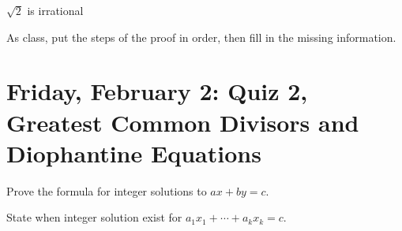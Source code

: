 \documentclass{ximera}
\begin{document}
\begin{br}
	\begin{prop*}
		$\sqrt{2}$ is irrational
	\end{prop*}

	As class, put the steps of the proof in order, then fill in the missing information.
\end{br}



%		
%			
%		

\section{Friday, February 2: Quiz 2, Greatest Common Divisors and Diophantine Equations}

\begin{obj}
	\item Prove the formula for integer solutions to $ax+by=c$.
	\item State when integer solution exist for $a_1x_1+\cdots+a_kx_k=c$.
\end{obj}
\end{document}
